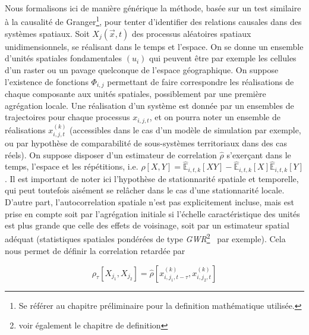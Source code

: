 {Nous formalisons ici de manière générique la méthode, basée sur un test similaire à la causalité de Granger\footnote{Se référer au chapitre préliminaire pour la definition mathématique utilisée.}, pour tenter d'identifier des relations causales dans des systèmes spatiaux. Soit $X_j(\vec{x},t)$ des processus aléatoires spatiaux unidimensionnels, se réalisant dans le temps et l'espace. On se donne un ensemble d'unités spatiales fondamentales $(u_i)$ qui peuvent être par exemple les cellules d'un raster ou un pavage quelconque de l'espace géographique. On suppose l'existence de fonctions $\Phi_{i,j}$ permettant de faire correspondre les réalisations de chaque composante aux unités spatiales, possiblement par une première agrégation locale. Une réalisation d'un système est donnée par un ensembles de trajectoires pour chaque processus $x_{i,j,t}$, et on pourra noter un ensemble de réalisations $x^{(k)}_{i,j,t}$ (accessibles dans le cas d'un modèle de simulation par exemple, ou par hypothèse de comparabilité de sous-systèmes territoriaux dans des cas réels). On suppose disposer d'un estimateur de correlation $\hat{\rho}$ s'exerçant dans le temps, l'espace et les répétitions, i.e. $\hat{\rho}\left[X,Y\right] = \hat{\mathbb{E}}_{i,t,k}\left[XY\right] - \hat{\mathbb{E}}_{i,t,k}\left[X\right]\hat{\mathbb{E}}_{i,t,k}\left[Y\right]$. Il est important de noter ici l'hypothèse de stationnarité spatiale et temporelle, qui peut toutefois aisément se relâcher dans le cas d'une stationnarité locale. D'autre part, l'autocorrelation spatiale n'est pas explicitement incluse, mais est prise en compte soit par l'agrégation initiale si l'échelle caractéristique des unités est plus grande que celle des effets de voisinage, soit par un estimateur spatial adéquat (statistiques spatiales pondérées de type \emph{GWR}\footnote{voir également le chapitre de definition}~\cite{brunsdon1998geographically} par exemple). Cela nous permet de définir la correlation retardée par
}

\begin{equation}
\rho_{\tau}\left[X_{j_1},X_{j_2}\right] = \hat{\rho}\left[x^{(k)}_{i,j_1,t - \tau},x^{(k)}_{i,j_2,t}\right]
\end{equation}

